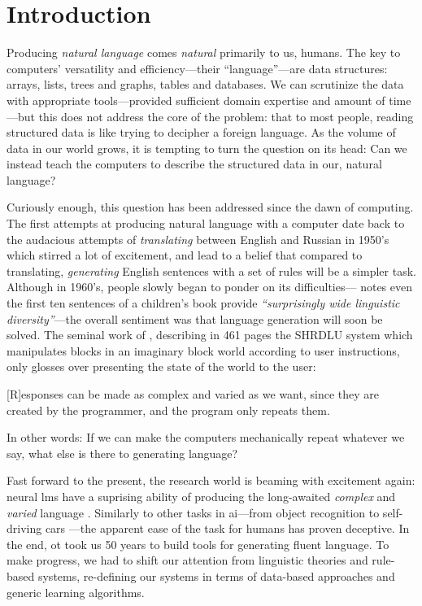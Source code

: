 \chapter{Introduction}
\label{chap:intro}
Producing \emph{natural language} comes \emph{natural} primarily to us, humans.
The key to computers' versatility and efficiency---their ``language''---are data structures: arrays, lists, trees and graphs, tables and databases.
We can scrutinize the data with appropriate tools---provided sufficient domain expertise and amount of time---but this does not address the core of the problem: that to most people, reading structured data is like trying to decipher a foreign language. As the volume of data in our world grows, it is tempting to turn the question on its head: Can we instead teach the computers to describe the structured data in our, natural language?


Curiously enough, this question has been addressed since the dawn of computing. The first attempts at producing natural language with a computer date back to the audacious attempts of \emph{translating} between English and Russian in 1950's \cite{sheridan1955research} which stirred a lot of excitement, and lead to a belief that compared to translating, \emph{generating} English sentences with a set of rules will be a simpler task. Although in 1960's, people slowly began to ponder on its difficulties---\citet{yngve1961random} notes even the first ten sentences of a children's book provide \emph{``surprisingly wide linguistic diversity''}---the overall sentiment was that language generation will soon be solved. The seminal work of \citet{winograd1971procedures}, describing in 461 pages the SHRDLU system which manipulates blocks in an imaginary block world according to user instructions, only glosses over presenting the state of the world to the user:
\begin{pquotation}{\citealp[p.384]{winograd1971procedures}}
    [R]esponses can be made as complex and varied as we want, since they are created by the programmer, and the program only repeats them.
\end{pquotation}
In other words: If we can make the computers mechanically repeat whatever we say, what else is there to generating language?

Fast forward to the present, the research world is beaming with excitement again: neural \acp{lm} have a suprising ability of producing the long-awaited \emph{complex} and \emph{varied} language \cite{radford2019language,brown2020language}. Similarly to other tasks in \ac{ai}---from object recognition \cite{papert1966summer} to self-driving cars \cite{autonomouscars}---the apparent ease of the task for humans has proven deceptive. In the end, ot took us 50 years to build tools for generating fluent language. To make progress, we had to shift our attention from linguistic theories and rule-based systems, re-defining our systems in terms of data-based approaches and generic learning algorithms.

